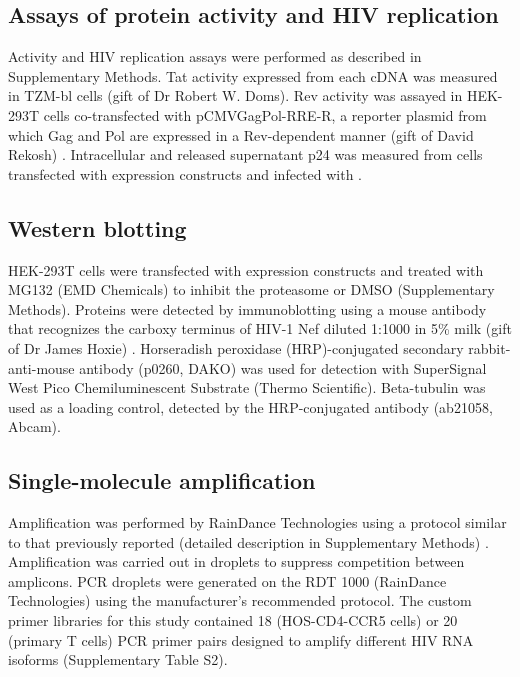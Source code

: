 \documentclass[../sherrill-Mix_thesis.tex]{subfiles}
\begin{document}
\subsection{Assays of protein activity and HIV replication}
Activity and HIV replication assays were performed as described in Supplementary Methods. Tat activity expressed from each cDNA was measured in TZM-bl cells \citep{Wei2003} (gift of Dr Robert W. Doms). Rev activity was assayed in HEK-293T cells co-transfected with pCMVGagPol-RRE-R, a reporter plasmid from which Gag and Pol are expressed in a Rev-dependent manner (gift of David Rekosh) \citep{Srinivasakumar1997}. Intracellular and released supernatant p24 was measured from cells transfected with expression constructs and infected with \hivEight{}.

\subsection{Western blotting}
HEK-293T cells were transfected with expression constructs and treated with MG132 (EMD Chemicals) to inhibit the proteasome or DMSO (Supplementary Methods). Proteins were detected by immunoblotting using a mouse antibody that recognizes the carboxy terminus of HIV-1 Nef diluted 1:1000 in 5\% milk (gift of Dr James Hoxie) \citep{Shugars1993}. Horseradish peroxidase (HRP)-conjugated secondary rabbit-anti-mouse antibody (p0260, DAKO) was used for detection with SuperSignal West Pico Chemiluminescent Substrate (Thermo Scientific). Beta-tubulin was used as a loading control, detected by the HRP-conjugated antibody (ab21058, Abcam). 

\subsection{Single-molecule amplification}
Amplification was performed by RainDance Technologies using a protocol similar to that previously reported (detailed description in Supplementary Methods) \citep{Tewhey2009}. Amplification was carried out in droplets to suppress competition between amplicons. PCR droplets were generated on the RDT 1000 (RainDance Technologies) using the manufacturer's recommended protocol. The custom primer libraries for this study contained 18 (HOS-CD4-CCR5 cells) or 20 (primary T cells) PCR primer pairs designed to amplify different HIV RNA isoforms (Supplementary Table S2). 
\end{document}
